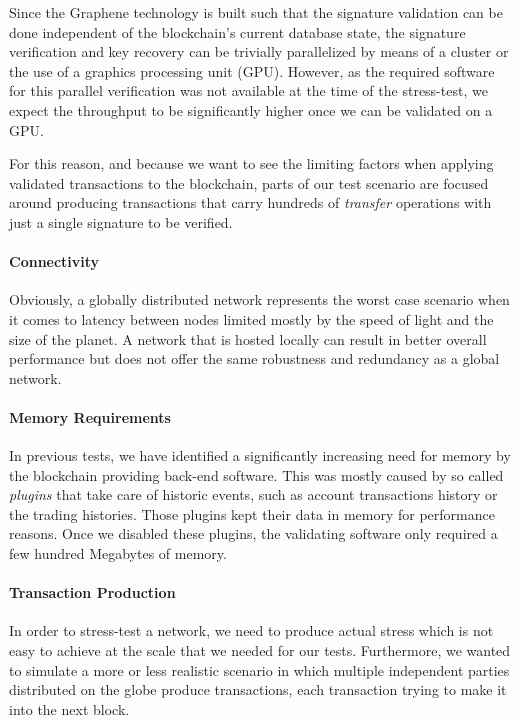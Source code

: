 Since the Graphene technology is built such that the signature validation can
be done independent of the blockchain's current database state, the signature
verification and key recovery can be trivially parallelized by means of a
cluster or the use of a graphics processing unit (GPU). However, as the
required software for this parallel verification was not available at the time
of the stress-test, we expect the throughput to be significantly higher once we
can be validated on a GPU.

For this reason, and because we want to see the limiting factors when applying
validated transactions to the blockchain, parts of our test scenario are
focused around producing transactions that carry hundreds of \emph{transfer}
operations with just a single signature to be verified.

\paragraph{Connectivity}
Obviously, a globally distributed network represents the worst case scenario
when it comes to latency between nodes limited mostly by the speed of light and
the size of the planet. A network that is hosted locally can result in better
overall performance but does not offer the same robustness and redundancy as a
global network.

\paragraph{Memory Requirements}
In previous tests, we have identified a significantly increasing need for
memory by the blockchain providing back-end software. This was mostly caused by
so called \emph{plugins} that take care of historic events, such as account
transactions history or the trading histories. Those plugins kept their data in
memory for performance reasons. Once we disabled these plugins, the validating
software only required a few hundred Megabytes of memory.

\paragraph{Transaction Production}
In order to stress-test a network, we need to produce actual stress which is not
easy to achieve at the scale that we needed for our tests. Furthermore, we
wanted to simulate a more or less realistic scenario in which multiple
independent parties distributed on the globe produce transactions, each
transaction trying to make it into the next block.

